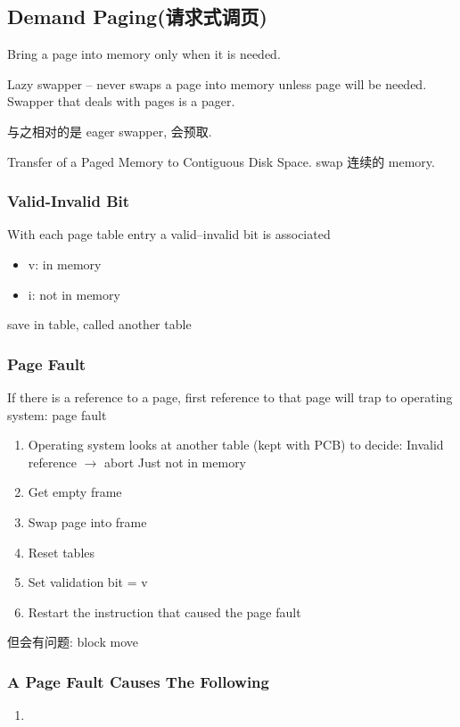 \subsection{Demand Paging(请求式调页)}
Bring a page into memory only when it is needed. 

Lazy swapper -- never swaps a page into memory unless page will be needed. Swapper that deals with pages is a pager.

与之相对的是 eager swapper, 会预取. 

Transfer of a Paged Memory to Contiguous Disk Space. swap 连续的 memory. 

\subsubsection{Valid-Invalid Bit}
With each page table entry a valid–invalid bit is associated
\begin{itemize}
    \item v: in memory
    \item i: not in memory
\end{itemize}
save in table, called another table

\subsubsection{Page Fault}
If there is a reference to a page, first reference to that page will trap to operating system: page fault
\begin{enumerate}
    \item Operating system looks at another table (kept with PCB)
    to decide:
    \subitem Invalid reference $\to$ abort
    \subitem Just not in memory
    \item Get empty frame
    \item Swap page into frame
    \item Reset tables
    \item Set validation bit = v
    \item Restart the instruction that caused the page fault
\end{enumerate}

但会有问题: block move

\subsubsection{A Page Fault Causes The Following}
\begin{enumerate}%
    \item 
\end{enumerate}

